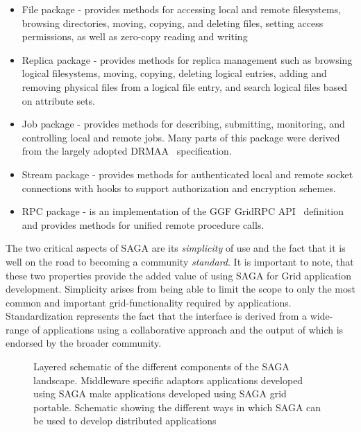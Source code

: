 \documentclass[conference,final]{IEEEtran}
\begin{document}
\begin{itemize}
\item File package - provides methods for accessing local and remote
  filesystems, browsing directories, moving, copying, and deleting
  files, setting access permissions, as well as zero-copy reading and
  writing
\item Replica package - provides methods for replica management such
  as browsing logical filesystems, moving, copying, deleting logical
  entries, adding and removing physical files from a logical file
  entry, and search logical files based on attribute sets.
\item Job package - provides methods for describing, submitting,
  monitoring, and controlling local and remote jobs. Many parts of
  this package were derived from the largely adopted
  DRMAA~\cite{drmaa_url} specification.
\item Stream package - provides methods for authenticated local and
  remote socket connections with hooks to support authorization and
  encryption schemes.
\item RPC package - is an implementation of the GGF GridRPC
  API~\cite{gridrpc_url} definition and provides methods for unified
  remote procedure calls.
\end{itemize}

The two critical aspects of SAGA are its {\it simplicity} of use and
the fact that it is well on the road to becoming a community {\it
  standard}.  It is important to note, that these two properties
provide the added value of using SAGA for Grid application
development.  Simplicity arises from being able to limit the scope to
only the most common and important grid-functionality required by
applications.  Standardization represents the fact that the interface
is derived from a wide-range of applications using a collaborative
approach and the output of which is endorsed by the broader community.


\begin{figure}[!h]
  \begin{center}
  \end{center}
  \caption{Layered schematic of the different components of the SAGA
    landscape.  Middleware specific adaptors applications developed
    using SAGA make applications developed using SAGA grid
    portable. Schematic showing the different ways in which SAGA can
    be used to develop distributed applications}
 \label{sagalayer}
\end{figure}
\end{document}
